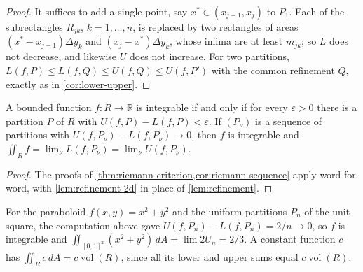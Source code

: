 \begin{proof}
It suffices to add a single point, say $x^*\in(x_{j-1},x_j)$ to $P_1$. Each of the subrectangles $R_{jk}$, $k=1,\ldots,n$, is replaced by two rectangles of areas $(x^*-x_{j-1})\Delta y_k$ and $(x_j-x^*)\Delta y_k$, whose infima are at least $m_{jk}$; so $L$ does not decrease, and likewise $U$ does not increase. For two partitions, $L(f,P)\le L(f,Q)\le U(f,Q)\le U(f,P')$ with the common refinement $Q$, exactly as in \cref{cor:lower-upper}.
\end{proof}

\begin{theorem}
\label{thm:riemann-criterion-2d}
A bounded function $f\colon R\to\mathbb R$ is integrable if and only if for every $\varepsilon>0$ there is a partition $P$ of $R$ with $U(f,P)-L(f,P)<\varepsilon$. If $(P_\nu)$ is a sequence of partitions with $U(f,P_\nu)-L(f,P_\nu)\to0$, then $f$ is integrable and $\iint_Rf=\lim_\nu L(f,P_\nu)=\lim_\nu U(f,P_\nu)$.
\end{theorem}

\begin{proof}
The proofs of \cref{thm:riemann-criterion,cor:riemann-sequence} apply word for word, with \cref{lem:refinement-2d} in place of \cref{lem:refinement}.
\end{proof}

For the paraboloid $f(x,y)=x^2+y^2$ and the uniform partitions $P_n$ of the unit square, the computation above gave $U(f,P_n)-L(f,P_n)=2/n\to0$, so $f$ is integrable and $\iint_{[0,1]^2}(x^2+y^2)\,dA=\lim 2U_n=2/3$. A constant function $c$ has $\iint_Rc\,dA=c\operatorname{vol}(R)$, since all its lower and upper sums equal $c\operatorname{vol}(R)$.

